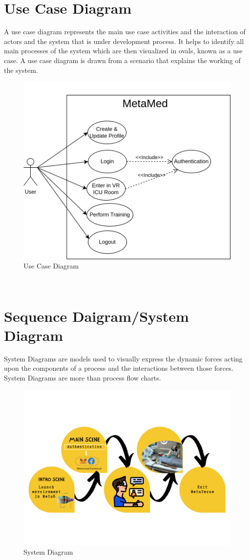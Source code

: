 \section{Use Case Diagram}
A use case diagram represents the main use case activities and the interaction of actors and the system that is under development process. It helps to identify all main processes of the system which are then visualized in ovals, known as a use case. A use case diagram is drawn from a scenario that explains the working of the system.
\begin{figure}[h]
    \centering
    \includegraphics[width=0.7\linewidth]{Images/Use Case.drawio.png}
    \caption{Use Case Diagram}
    \label{fig:system-diagram}
\end{figure}
\\
\section{Sequence Daigram/System Diagram}
System Diagrams are models used to visually express the dynamic forces acting upon the components of a process and the interactions between those forces. System Diagrams are more than process flow charts.
\begin{figure}[h]
    \centering
    \includegraphics[width=0.8\linewidth]{Images/system.png}
    \caption{System Diagram}
    \label{fig:system-diagram}
\end{figure}
\\
